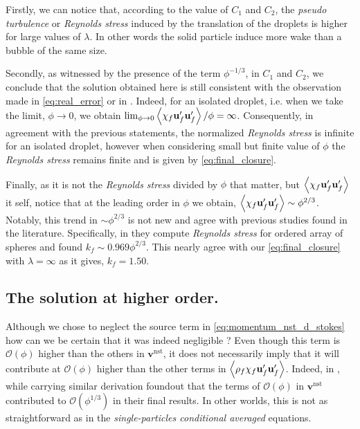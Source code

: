 Firstly, we can notice that, according to the value of $C_1$ and $C_2$, the \textit{pseudo turbulence} or \textit{Reynolds stress} induced by the translation of the droplets is higher for large values of $\lambda$. 
In other words the solid particle induce more wake than a bubble of the same size. 

Secondly, as witnessed by the presence of the term $\phi^{-1/3}$, in $C_1$ and $C_2$, we conclude that the solution obtained here is still consistent with the observation made in \ref{eq:real_error} or in \citet{caflisch1985variance}. 
Indeed, for an isolated droplet, i.e. when we take the limit, $\phi \to 0$, we obtain $\lim_{\phi \to 0} \left<\chi_f \textbf{u}_f' \textbf{u}_f'\right> / \phi = \infty$. 
Consequently, in agreement with the previous statements, the normalized \textit{Reynolds stress} is infinite for an isolated droplet, however when considering small but finite value of $\phi$ the \textit{Reynolds stress} remains finite and is given by \ref{eq:final_closure}. 

Finally, as it is not the \textit{Reynolds stress} divided by $\phi$ that matter, but $\left<\chi_f\textbf{u}_f'\textbf{u}_f'\right>$ it self, notice that at the leading order in $\phi$ we obtain,  $\left<\chi_f\textbf{u}_f'\textbf{u}_f'\right>\sim\phi^{2/3}$. 
Notably, this  trend in $\sim\phi^{2/3}$ is not new and agree with previous studies found in the literature.
Specifically, in \citet{hill2001first} they compute \textit{Reynolds stress} for ordered array of spheres and found $k_f \sim 0.969 \phi^{2/3}$. 
This nearly agree with our \ref{eq:final_closure} with $\lambda =\infty$ as it gives, $k_f  = 1.50$. 



\subsection{The solution at higher order. }

Although we chose to neglect the source term in \ref{eq:momentum_nst_d_stokes} how can we be certain that it was indeed negligible ? 
Even though this term is $\mathcal{O}(\phi)$ higher than the others in $\textbf{v}^\text{nst}$, it does not necessarily imply that it will contribute at $\mathcal{O}(\phi)$ higher than the other terms in $\left<\rho_f\chi_f \textbf{u}_f'\textbf{u}_f'\right>$. 
Indeed, in \citet{zhang2021ensemble}, while carrying similar derivation foundout that the terms of $\mathcal{O}(\phi)$ in $\textbf{v}^\text{nst}$ contributed to $\mathcal{O}(\phi^{1/3})$ in their final results. 
In other worlds, this is not as straightforward as in the \textit{single-particles conditional averaged} equations. 

